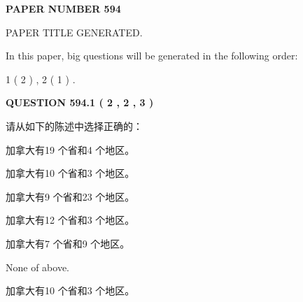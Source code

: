 \documentclass{ctexart}
\begin{document}
   
   
   
\newpage 
\setcounter{page}{ 
   594001 } 
   
   
   
   
 {\textbf{ \Large{ PAPER NUMBER  594  }}}
   
   
\vspace{0.2in}
   
   
   
   
   
   
   
   
 \vspace{0.2in}
 
 
 
 
   
   
 PAPER TITLE GENERATED.
   
   
   
\vspace{0.2in}
   
In this paper, big questions will be generated in the following order: 
   
   
   1 ( 2 )
 ,
   2 ( 1 )
 .
  
\vspace{0.2in}
  
{\textbf{\Large{QUESTION
594.1 
 ( 2 , 2 , 3 )
}}}
  
  
请从如下的陈述中选择正确的：
 
 
加拿大有19 个省和4 个地区。
 
 
加拿大有10 个省和3 个地区。
 
 
加拿大有9 个省和23 个地区。
 
 
加拿大有12 个省和3 个地区。
 
 
加拿大有7 个省和9 个地区。
 
 
 None of above.
 
 
\noindent{}
 
 
加拿大有10 个省和3 个地区。
 
 
\noindent{}
 
 
   
   
   
\end{document}

